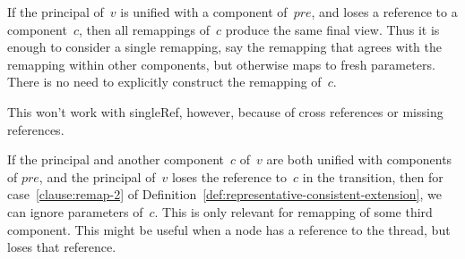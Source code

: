 

 

\begin{improve}
If the principal of~$v$ is unified with a component of~$pre$, and loses a
reference to a component~$c$, then all remappings of~$c$ produce the same final
view.  Thus it is enough to consider a single remapping, say the remapping that
agrees with the remapping within other components, but otherwise maps to fresh
parameters.  There is no need to explicitly construct the remapping of~$c$.  
%

This won't work with singleRef, however, because of cross references or
missing references. 
\end{improve}


\begin{improve} 
If the principal and another component~$c$ of~$v$ are both unified with
components of $pre$, and the principal of~$v$ loses the reference to~$c$ in
the transition, then for case~\ref{clause:remap-2} of
Definition~\ref{def:representative-consistent-extension}, we can ignore
parameters of~$c$.  This is only relevant for remapping of some third
component.
%
This might be useful when a node has a reference to the thread, but loses
that reference.
\end{improve}
